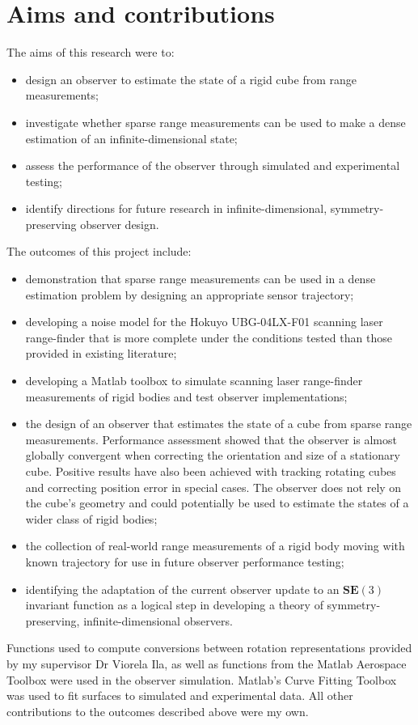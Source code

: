 \chapter*{Aims and contributions}

The aims of this research were to:
\begin{itemize}
\item design an observer to estimate the state of a rigid cube from range measurements;
\item investigate whether sparse range measurements can be used to make a dense estimation of an infinite-dimensional state;
\item assess the performance of the observer through simulated and experimental testing; 
\item identify directions for future research in infinite-dimensional, symmetry-preserving observer design.
\end{itemize}

The outcomes of this project include:
\begin{itemize}
\item demonstration that sparse range measurements can be used in a dense estimation problem by designing an appropriate sensor trajectory;
\item developing a noise model for the Hokuyo UBG-04LX-F01 scanning laser range-finder that is more complete under the conditions tested than those provided in existing literature;
\item developing a Matlab toolbox to simulate scanning laser range-finder measurements of rigid bodies and test observer implementations;
\item the design of an observer that estimates the state of a cube from sparse range measurements. Performance assessment showed that the observer is almost globally convergent when correcting the orientation and size of a stationary cube. Positive results have also been achieved with tracking rotating cubes and correcting position error in special cases. The observer does not rely on the cube's geometry and could potentially be used to estimate the states of a wider class of rigid bodies;
\item the collection of real-world range measurements of a rigid body moving with known trajectory for use in future observer performance testing;
\item identifying the adaptation of the current observer update to an $\mathbf{SE}(3)$ invariant function as a logical step in developing a theory of symmetry-preserving, infinite-dimensional observers.
\end{itemize}

Functions used to compute conversions between rotation representations provided by my supervisor Dr Viorela Ila, as well as functions from the Matlab Aerospace Toolbox were used in the observer simulation. Matlab's Curve Fitting Toolbox was used to fit surfaces to simulated and experimental data.
All other contributions to the outcomes described above were my own.